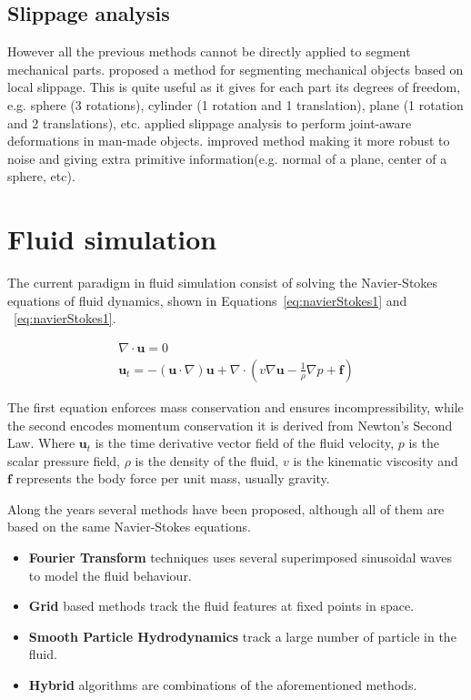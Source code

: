 \subsection{Slippage analysis}
\label{SlippageAnalysis}

However all the previous methods cannot be directly applied to segment mechanical parts.
\cite{Gelfand2004} proposed a method for segmenting mechanical objects based on local slippage.
This is quite useful as it gives for each part its degrees of freedom, e.g. sphere (3 rotations), cylinder (1 rotation and 1 translation), plane (1 rotation and 2 translations), etc.
\cite{Xu2009} applied slippage analysis to perform joint-aware deformations in man-made objects.
\cite{Yi2014} improved \cite{Gelfand2004} method making it more robust to noise and giving extra primitive information(e.g. normal of a plane, center of a sphere, etc).

\section{Fluid simulation}
\label{prevWorkFluidSim}

The current paradigm in fluid simulation consist of solving the Navier-Stokes equations of fluid dynamics, shown in Equations~\ref{eq:navierStokes1} and  ~\ref{eq:navierStokes1}.

\begin{gather}
\label{eq:navierStokes1}
\nabla \cdot \mathbf{u} = 0\\
\label{eq:navierStokes2}
\mathbf{u}_t = -(\mathbf{u} \cdot \nabla)\mathbf{u} + \nabla \cdot ( v \nabla \mathbf{u} - \frac{1}{\rho} \nabla p + \mathbf{f} )
\end{gather}

The first equation enforces mass conservation and ensures incompressibility, while the second encodes momentum conservation it is derived from Newton's Second Law.
Where $\mathbf{u}_t$ is the time derivative vector field of the fluid velocity, $p$  is the scalar pressure field, $\rho$ is the density of the fluid, $v$ is the kinematic viscosity and $\mathbf{f}$ represents the body force per unit mass, usually gravity.

Along the years several methods have been proposed, although all of them are based on the same Navier-Stokes equations.

\begin{itemize}
\item \textbf{Fourier Transform} techniques uses several superimposed sinusoidal waves to model the fluid behaviour.
\item \textbf{Grid} based methods track the fluid features at fixed points in space.
\item \textbf{Smooth Particle Hydrodynamics} track a large number of particle in the fluid.
\item \textbf{Hybrid} algorithms are combinations of the aforementioned methods.
\end{itemize}

